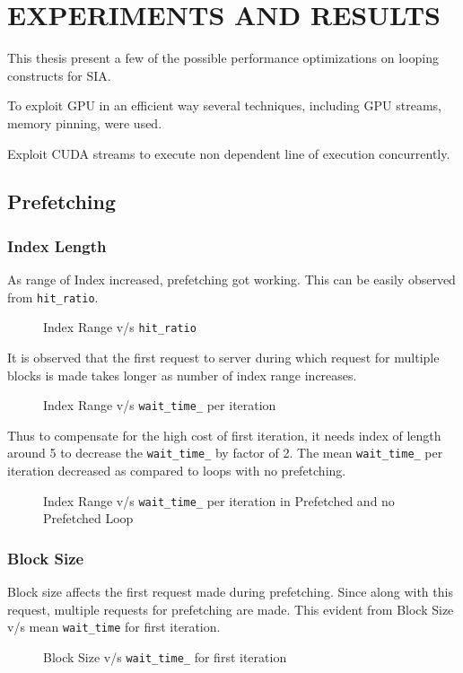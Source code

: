 \chapter{EXPERIMENTS AND RESULTS}\label{results}

This thesis present a few of the possible performance optimizations on looping
constructs for SIA.

To exploit GPU in an efficient way several techniques, including GPU streams,
memory pinning, were used.

Exploit CUDA streams to execute non dependent line of execution concurrently.

\section{Prefetching}
\subsection{Index Length}
As range of Index increased, prefetching got working. This can be easily observed
from \texttt{hit\_ratio}.
\begin{figure}[h]
  
  \caption{Index Range v/s \texttt{hit\_ratio}}
\end{figure}

It is observed that the first request to server during which request for multiple
blocks is made takes longer as number of index range increases.
\begin{figure}[h]
  
  \caption{Index Range v/s \texttt{wait\_time\_} per iteration}
\end{figure}

Thus to compensate for the high cost of first iteration, it needs index of length
around 5 to decrease the \texttt{wait\_time\_} by factor of 2. The mean \texttt{wait\_time\_}
per iteration decreased as compared to loops with no prefetching.
\begin{figure}[h]
  
  \caption{Index Range v/s \texttt{wait\_time\_} per iteration in Prefetched and no Prefetched Loop}
\end{figure}

\subsection{Block Size}
Block size affects the first request made during prefetching. Since along with this
request, multiple requests for prefetching are made. This evident from Block Size
v/s mean \texttt{wait\_time} for first iteration.
\begin{figure}[h]
  
  \caption{Block Size v/s \texttt{wait\_time\_} for first iteration}
\end{figure}

